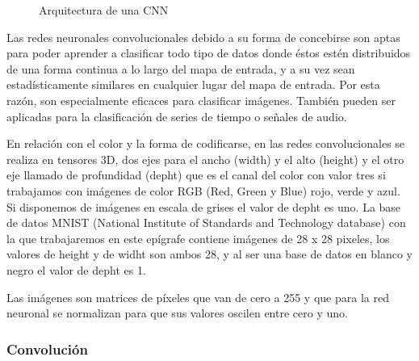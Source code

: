 \documentclass[
  a4paper,
  DIV=11,
  numbers=noendperiod]{scrreprt}
\begin{document}
\begin{figure}


\caption{\label{fig-arquitectura_convolucional}Arquitectura de una CNN}

\end{figure}%

Las redes neuronales convolucionales debido a su forma de concebirse son
aptas para poder aprender a clasificar todo tipo de datos donde éstos
estén distribuidos de una forma continua a lo largo del mapa de entrada,
y a su vez sean estadísticamente similares en cualquier lugar del mapa
de entrada. Por esta razón, son especialmente eficaces para clasificar
imágenes. También pueden ser aplicadas para la clasificación de series
de tiempo o señales de audio.

En relación con el color y la forma de codificarse, en las redes
convolucionales se realiza en tensores 3D, dos ejes para el ancho
(width) y el alto (height) y el otro eje llamado de profundidad (depht)
que es el canal del color con valor tres si trabajamos con imágenes de
color RGB (Red, Green y Blue) rojo, verde y azul. Si disponemos de
imágenes en escala de grises el valor de depht es uno. La base de datos
MNIST (National Institute of Standards and Technology database) con la
que trabajaremos en este epígrafe contiene imágenes de 28 x 28 pixeles,
los valores de height y de widht son ambos 28, y al ser una base de
datos en blanco y negro el valor de depht es 1.

Las imágenes son matrices de píxeles que van de cero a 255 y que para la
red neuronal se normalizan para que sus valores oscilen entre cero y
uno.

\subsubsection{Convolución}\label{convoluciuxf3n}
\end{document}
